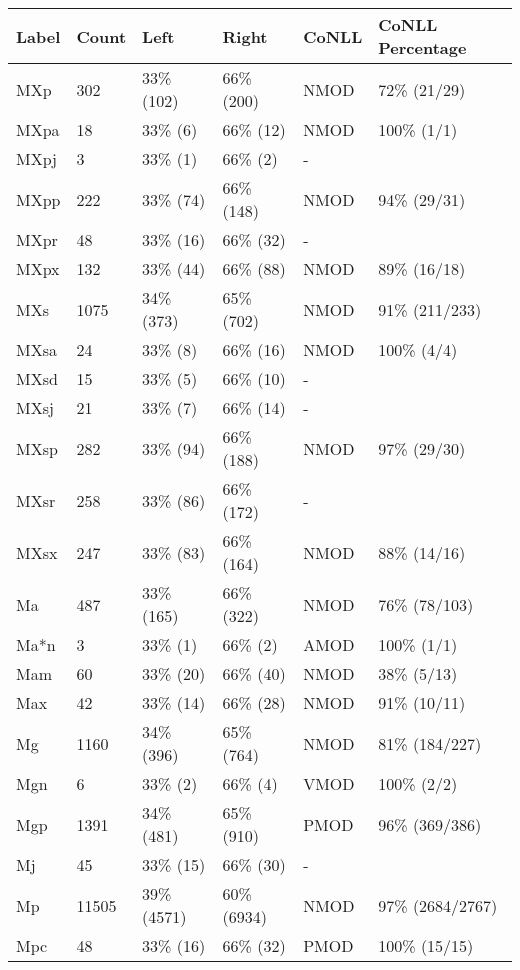 \begin{figure*}
\begin{tabular}{|l|l|l|l||l|l|}
\hline
Label & Count & Left & Right & CoNLL & CoNLL Percentage\\ 
\hline
 MXp & 302 & 33\% (102) & 66\% (200) & NMOD & 72\% (21/29) \\ 
\hline
 MXpa & 18 & 33\% (6) & 66\% (12) & NMOD & 100\% (1/1) \\ 
\hline
 MXpj & 3 & 33\% (1) & 66\% (2) & - &  \\ 
\hline
 MXpp & 222 & 33\% (74) & 66\% (148) & NMOD & 94\% (29/31) \\ 
\hline
 MXpr & 48 & 33\% (16) & 66\% (32) & - &  \\ 
\hline
 MXpx & 132 & 33\% (44) & 66\% (88) & NMOD & 89\% (16/18) \\ 
\hline
 MXs & 1075 & 34\% (373) & 65\% (702) & NMOD & 91\% (211/233) \\ 
\hline
 MXsa & 24 & 33\% (8) & 66\% (16) & NMOD & 100\% (4/4) \\ 
\hline
 MXsd & 15 & 33\% (5) & 66\% (10) & - &  \\ 
\hline
 MXsj & 21 & 33\% (7) & 66\% (14) & - &  \\ 
\hline
 MXsp & 282 & 33\% (94) & 66\% (188) & NMOD & 97\% (29/30) \\ 
\hline
 MXsr & 258 & 33\% (86) & 66\% (172) & - &  \\ 
\hline
 MXsx & 247 & 33\% (83) & 66\% (164) & NMOD & 88\% (14/16) \\ 
\hline
 Ma & 487 & 33\% (165) & 66\% (322) & NMOD & 76\% (78/103) \\ 
\hline
 Ma*n & 3 & 33\% (1) & 66\% (2) & AMOD & 100\% (1/1) \\ 
\hline
 Mam & 60 & 33\% (20) & 66\% (40) & NMOD & 38\% (5/13) \\ 
\hline
 Max & 42 & 33\% (14) & 66\% (28) & NMOD & 91\% (10/11) \\ 
\hline
 Mg & 1160 & 34\% (396) & 65\% (764) & NMOD & 81\% (184/227) \\ 
\hline
 Mgn & 6 & 33\% (2) & 66\% (4) & VMOD & 100\% (2/2) \\ 
\hline
 Mgp & 1391 & 34\% (481) & 65\% (910) & PMOD & 96\% (369/386) \\ 
\hline
 Mj & 45 & 33\% (15) & 66\% (30) & - &  \\ 
\hline
 Mp & 11505 & 39\% (4571) & 60\% (6934) & NMOD & 97\% (2684/2767) \\ 
\hline
 Mpc & 48 & 33\% (16) & 66\% (32) & PMOD & 100\% (15/15) \\ 

\end{tabular}
\end{figure*}
